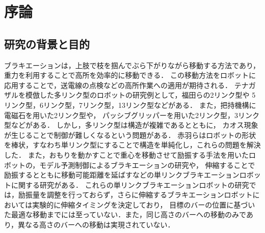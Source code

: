 \chapter[序論]%
        {序論}
        \section{研究の背景と目的}

          ブラキエーションは，上肢で枝を掴んでぶら下がりながら移動する方法であり，重力を利用することで高所を効率的に移動できる．
          この移動方法をロボットに応用することで\cite{福田敏男1990ブラキエーション形移動ロボットの研究}，送電線の点検などの高所作業への適用が期待される．
          テナガザルを模倣した多リンク型のロボットの研究例として，福田らの2リンク型\cite{福田敏男1991ブラキエーション形移動ロボットの研究2}\cite{福田敏男1992ブラキエーション形移動ロボットの研究}\cite{齋藤史倫1993ブラキエーション形移動ロボットの研究}\cite{齋藤史倫1995学習とロボット}\cite{福田敏男1996強化学習法を用いたファジィコントローラの生成}\cite{中西淳1998解析的手法による}\cite{中西淳19992}\cite{中西淳2001ハイブリッドコントローラによる}や
          5リンク型\cite{福田敏男1991ブラキエーション形移動ロボットの研究}，6リンク型\cite{福田敏男1990ブラキエーション形移動ロボットの研究}，7リンク型\cite{齋藤史倫1994ブラキエーション形移動ロボットの研究}，13リンク型\cite{長谷川泰久2001ブラキエーション形移動ロボットの研究}などがある．
          また，把持機構に電磁石を用いた2リンク型\cite{山川雄司2016ブラキエーションロボットの開発と運動生成}\cite{山川雄司2016-2ブラキエーションロボットの開発と運動生成}や，
          パッシブグリッパーを用いた2リンク型\cite{javadi2023acromonk}，3リンク型\cite{grama2024ricmonk}などがある．
          しかし，多リンク型は構造が複雑であるとともに，
          カオス現象\cite{鈴木三男2000二重振り子におけるカオス的振舞}が生じることで制御が難しくなるという問題がある．
          赤羽らはロボットの形状を棒状，すなわち単リンク型にすることで構造を単純化し，これらの問題を解決した\cite{akahane2022single}．
          また，おもりを動かすことで重心を移動させて励振する手法\cite{lieskovsky2023optimal}を用いたロボットの，モデル予測制御\cite{Hijiri:Robomech2024-1}によるブラキエーションの研究や，
          伸縮することで励振するとともに移動可能距離を延ばす\cite{Hijiri:Robomech2024}などの単リンクブラキエーションロボットに関する研究がある．
          これらの単リンクブラキエーションロボットの研究では，励振量を調整を行っておらず，さらに伸縮するブラキエーションロボットにおいては実験的に伸縮タイミングを決定しており，
          目標のバーの位置に基づいた最適な移動までには至っていない．また，同じ高さのバーへの移動のみであり，異なる高さのバーへの移動は実現されていない．
          
